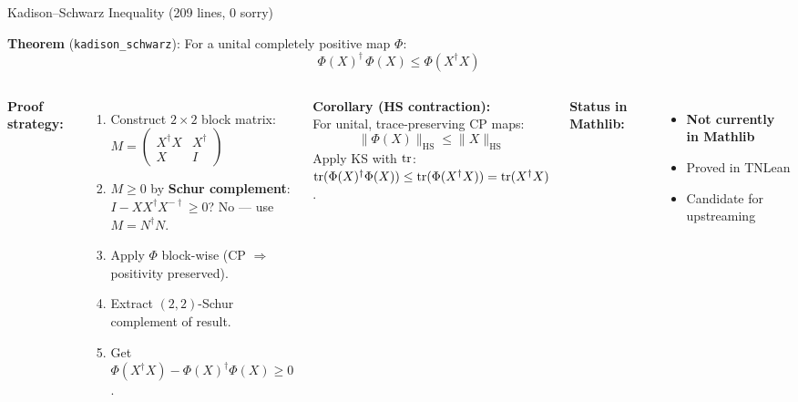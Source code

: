 \documentclass[aspectratio=169,10pt]{beamer}
\begin{document}
\begin{frame}{Kadison--Schwarz Inequality \textcolor{leangreen}{(209 lines, 0 sorry)}}
    \vspace{-0.5em}

    \textbf{Theorem} (\texttt{kadison\_schwarz}):
    {\small For a unital completely positive map $\Phi$:}
    \[
        \Phi(X)^\dagger\,\Phi(X) \leq  \Phi(X^\dagger X)
    \]

    \vspace{0.15em}
    \begin{columns}[T]
        \textbf{\textcolor{leangreen}{Proof strategy:}}
        \begin{enumerate}\itemsep0.1em\small
            \item Construct $2\times 2$ block matrix:
                $M = \begin{pmatrix} X^\dagger X & X^\dagger \\ X & I \end{pmatrix}$
            \item $M \geq 0$ by \textbf{Schur complement}:\\
                $I - X X^\dagger X^{-\dagger} \geq 0$?
                No --- use $M = N^\dagger N$.
            \item Apply $\Phi$ block-wise (CP $\Rightarrow$ positivity preserved).
            \item Extract $(2,2)$-Schur complement of result.
            \item Get $\Phi(X^\dagger X) - \Phi(X)^\dagger\Phi(X) \geq 0$.
        \end{enumerate}

        \textbf{\textcolor{leangreen}{Corollary} (HS contraction):}\\
        {\small For unital, trace-preserving CP maps:}
        \[
            \|\Phi(X)\|_{\mathrm{HS}} \leq  \|X\|_{\mathrm{HS}}
        \]
        {\scriptsize Apply KS with $\mathrm{tr}$:
        $\mathrm{tr}(\Phi(X)^\dagger\Phi(X)) \leq \mathrm{tr}(\Phi(X^\dagger X)) = \mathrm{tr}(X^\dagger X)$.}

        \vspace{0.3em}
        {\small\textbf{Status in Mathlib:}}
        \begin{itemize}\itemsep0.05em\scriptsize
            \item[\textcolor{softred}{$\times$}] \textbf{Not currently in Mathlib}
            \item[\textcolor{leangreen}{\checkmark}] Proved in TNLean
            \item[\textcolor{leangreen}{\checkmark}] Candidate for upstreaming
        \end{itemize}
    \end{columns}
\end{frame}
\end{document}
